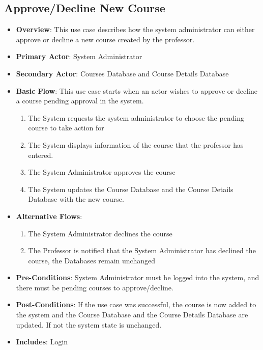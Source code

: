 \documentclass[12pt, a4]{article}
\begin{document}
\subsection{Approve/Decline New Course}
\begin{itemize}
    \item \textbf{Overview}: This use case describes how the system administrator can either approve or decline a new course created by the professor.
    \item \textbf{Primary Actor}: System Administrator
    \item \textbf{Secondary Actor}: Courses Database and Course Details Database
    \item \textbf{Basic Flow}: This use case starts when an actor wishes to approve or decline a course pending approval in the system.
        \begin{enumerate}
            \item The System requests the system administrator to choose the pending course to take action for
            \item The System displays information of the course that the professor has entered.
            \item The System Administrator approves the course
            \item The System updates the Course Database and the Course Details Database with the new course.
        \end{enumerate}
    \item \textbf{Alternative Flows}:
        \begin{enumerate}
            \item The System Administrator declines the course
            \item The Professor is notified that the System Administrator has declined the course, the Databases remain unchanged
        \end{enumerate}
    \item \textbf{Pre-Conditions}: System Administrator must be logged into the system, and there must be pending courses to approve/decline.
    \item \textbf{Post-Conditions}: If the use case was successful, the course is now added to the system and the Course Database and the Course Details Database are updated. If not the system state is unchanged.
    \item \textbf{Includes}: Login
\end{itemize}
\end{document}
